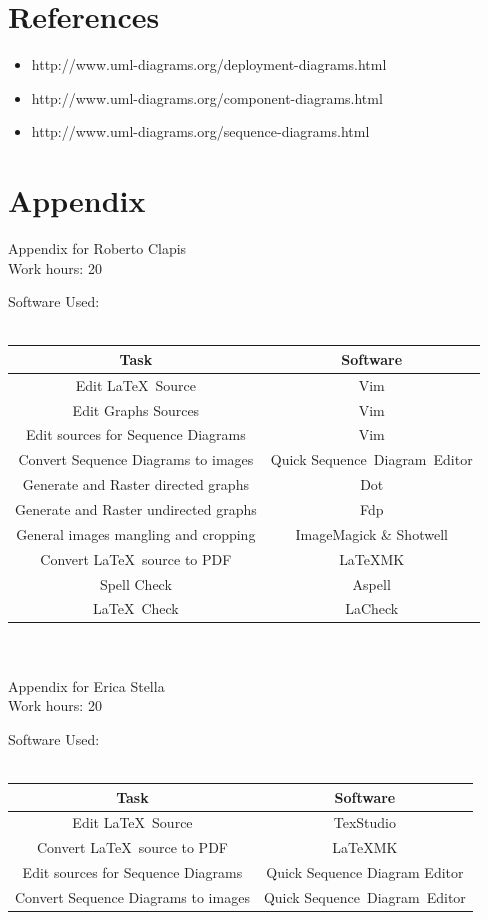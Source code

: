 \documentclass{article}
\begin{document}
	\section{References}
	\begin{itemize}
		\item http://www.uml-diagrams.org/deployment-diagrams.html
		\item http://www.uml-diagrams.org/component-diagrams.html
		\item http://www.uml-diagrams.org/sequence-diagrams.html
	\end{itemize}
	\clearpage
	\section{Appendix}
	Appendix for Roberto Clapis\\
	Work hours: 20
	\begin{center}
		Software Used:\\
		\-\\
		\begin{tabular}{*{2}{c}}
			\toprule
			Task & Software \\
			\midrule
			Edit \LaTeX\ Source & Vim\\
			Edit Graphs Sources & Vim\\
			Edit sources for Sequence Diagrams & Vim\\
			Convert Sequence Diagrams to images & Quick Sequence Diagram Editor\\
			Generate and Raster directed graphs& Dot\\
			Generate and Raster undirected graphs& Fdp\\
			General images mangling and cropping & ImageMagick \& Shotwell\\
			Convert \LaTeX\ source to PDF & \LaTeX\-MK\\
			Spell Check & Aspell \\
			\LaTeX\ Check & LaCheck\\
			\bottomrule
		\end{tabular}
	\end{center}
	\-\\
	\-\\
	Appendix for Erica Stella\\
	Work hours: 20
	\begin{center}
		Software Used:\\
		\-\\
		\begin{tabular}{*{2}{c}}
			\toprule
			Task & Software \\
			\midrule
			Edit \LaTeX\ Source & TexStudio\\
			Convert \LaTeX\ source to PDF & \LaTeX\-MK\\
			Edit sources for Sequence Diagrams & Quick Sequence Diagram Editor\\
			Convert Sequence Diagrams to images & Quick Sequence Diagram Editor\\
			\bottomrule
		\end{tabular}
	\end{center}
	
\end{document}

